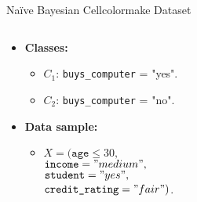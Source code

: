 \begin{frame}{Naïve Bayesian Cellcolormake Dataset}
	\begin{columns}
		\begin{column}{0.4\textwidth}
			\vspace{-2cm}
			\begin{itemize}
				\item \textbf{Classes:}
				      \begin{itemize}
					      \item $C_1$: \texttt{buys\_computer} = "yes".
					      \item $C_2$: \texttt{buys\_computer} = "no".
				      \end{itemize}
				\item \textbf{Data sample:}
				      \begin{itemize}
					      \item $X = (\texttt{age} \leq 30,$ \\
					            $\texttt{income} = "medium",$ \\
					            $\texttt{student} = "yes",$\\
					            $\texttt{credit\_rating} = "fair")$.
				      \end{itemize}
			\end{itemize}
		\end{column}
		\begin{column}{0.6\textwidth}
			\resizebox{\columnwidth}{!}{%
				
			}
		\end{column}
	\end{columns}
\end{frame}

